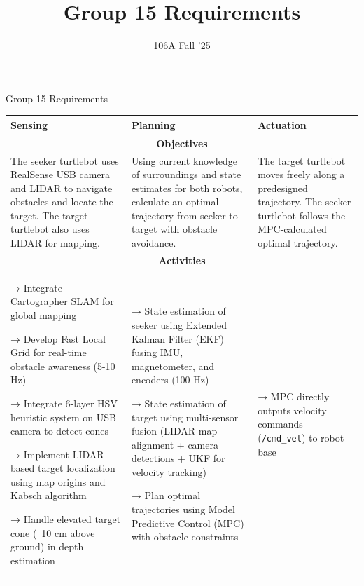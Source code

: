 \documentclass[aspectratio=169]{beamer}
\title{Group 15 Requirements}
\author{}
\date{106A Fall '25}
\begin{document}
\begin{frame}[plain]
\titlepage
\end{frame}

\begin{frame}{Group 15 Requirements}
\vspace{-0.3cm}
\centering

\begin{table}[h]
\centering
\small
\begin{tabular}{|p{}|p{}|p{}|}
\hline
\textcolor{slideyellow}{\textbf{Sensing}} & \textcolor{slideyellow}{\textbf{Planning}} & \textcolor{slideyellow}{\textbf{Actuation}} \\
\hline
\hline
\multicolumn{3}{|c|}{\textcolor{slidegreen}{\textbf{Objectives}}} \\
\hline
\vspace{0.1cm}
The seeker turtlebot uses RealSense USB camera and LIDAR to navigate obstacles and locate the target. The target turtlebot also uses LIDAR for mapping. & Using current knowledge of surroundings and state estimates for both robots, calculate an optimal trajectory from seeker to target with obstacle avoidance. & The target turtlebot moves freely along a predesigned trajectory. The seeker turtlebot follows the MPC-calculated optimal trajectory. \\
\hline
\hline
\multicolumn{3}{|c|}{\textcolor{slidegreen}{\textbf{Activities}}} \\
\hline
\vspace{0.1cm}
→ Integrate Cartographer SLAM for global mapping

→ Develop Fast Local Grid for real-time obstacle awareness (5-10 Hz)

→ Integrate 6-layer HSV heuristic system on USB camera to detect cones

→ Implement LIDAR-based target localization using map origins and Kabsch algorithm

→ Handle elevated target cone (~10 cm above ground) in depth estimation & → State estimation of seeker using Extended Kalman Filter (EKF) fusing IMU, magnetometer, and encoders (100 Hz)

→ State estimation of target using multi-sensor fusion (LIDAR map alignment + camera detections + UKF for velocity tracking)

→ Plan optimal trajectories using Model Predictive Control (MPC) with obstacle constraints & → MPC directly outputs velocity commands (\texttt{/cmd\_vel}) to robot base


\end{tabular}
\end{table}
\end{frame}
\end{document}
